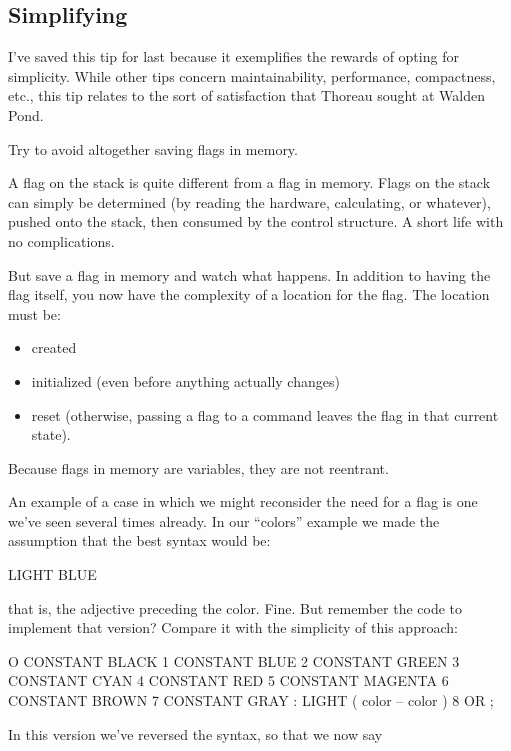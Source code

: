 \subsection{Simplifying}%
%

I've saved this tip for last because it exemplifies the rewards of opting
for simplicity. While other tips concern maintainability, performance,
compactness, etc., this tip relates to the sort of satisfaction that
Thoreau sought at Walden Pond.

\begin{tip}
Try to avoid altogether saving flags in memory.
\end{tip}
A flag on the stack is quite different from a flag in memory. Flags on the
stack can simply be determined (by reading the hardware, calculating, or
whatever), pushed onto the stack, then consumed by the control structure.
A short life with no complications.

But save a flag in memory and watch what happens. In addition to
having the flag itself, you now have the complexity of a location for the
flag. The location must be:

\begin{itemize}
\item created
\item initialized (even before anything actually changes)
\item reset (otherwise, passing a flag to a command leaves the flag in
that current state).
\end{itemize}
Because flags in memory are variables, they are not reentrant.

An example of a case in which we might reconsider the need for a flag is
one we've seen several times already. In our ``colors'' example we made
the assumption that the best syntax would be:

\begin{Code}
LIGHT BLUE
\end{Code}
that is, the adjective  preceding the color. Fine. But
remember the code to implement that version? Compare it with the
simplicity of this approach:

\begin{Code}
O CONSTANT BLACK    1 CONSTANT BLUE    2 CONSTANT GREEN
3 CONSTANT CYAN     4 CONSTANT RED     5 CONSTANT MAGENTA
6 CONSTANT BROWN    7 CONSTANT GRAY
: LIGHT   ( color -- color )  8 OR ;
\end{Code}
In this version we've reversed the syntax, so that we now say


